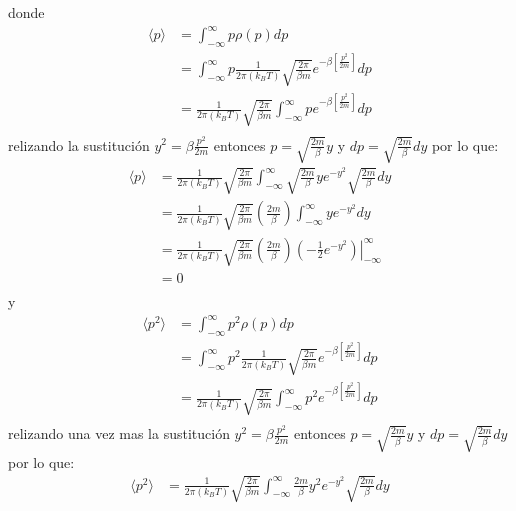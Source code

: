 \documentclass[a4paper]{article}
\begin{document}
\begin{answer}
$$        $$
        donde
        \begin{align*}
            \langle p\rangle &= \int_{-\infty}^{\infty} p \rho(p) dp \\
            &= \int_{-\infty}^{\infty} p \frac{1}{2 \pi (k_B T)} \sqrt{\frac{2\pi}{\beta m}} e^{-\beta\left[\frac{p^2}{2 m}\right]} dp \\
            &= \frac{1}{2 \pi (k_B T)} \sqrt{\frac{2\pi}{\beta m}}  \int_{-\infty}^{\infty} p e^{-\beta\left[\frac{p^2}{2 m}\right]} dp \\
        \end{align*}
        relizando la sustitución $y^2 = \beta \frac{p^2}{2m}$ entonces $p = \sqrt{\frac{2m}{\beta}} y$ y $dp = \sqrt{\frac{2m}{\beta}} dy$ por lo que:
        \begin{align*}
            \langle p\rangle &= \frac{1}{2 \pi (k_B T)} \sqrt{\frac{2\pi}{\beta m}}  \int_{-\infty}^{\infty} \sqrt{\frac{2m}{\beta}} y e^{-y^2} \sqrt{\frac{2m}{\beta}} dy \\
            &= \frac{1}{2 \pi (k_B T)} \sqrt{\frac{2\pi}{\beta m}}\left(
                \frac{2m}{\beta}
            \right)\int_{-\infty}^{\infty} y e^{-y^2} dy \\
            &= \frac{1}{2 \pi (k_B T)} \sqrt{\frac{2\pi}{\beta m}}\left(
                \frac{2m}{\beta}
            \right) \left.\left(-\frac{1}{2} e^{-y^2} \right)\right|_{-\infty}^{\infty} \\
            &= 0 \\
        \end{align*}
        y
        \begin{align*}
            \langle p^2\rangle &= \int_{-\infty}^{\infty} p^2 \rho(p) dp \\
            &= \int_{-\infty}^{\infty} p^2\frac{1}{2 \pi (k_B T)} \sqrt{\frac{2\pi}{\beta m}} e^{-\beta\left[\frac{p^2}{2 m}\right]}  dp \\
            &=\frac{1}{2 \pi (k_B T)} \sqrt{\frac{2\pi}{\beta m}} \int_{-\infty}^{\infty} p^2 e^{-\beta\left[\frac{p^2}{2 m}\right]} dp \\
        \end{align*}
        relizando una vez mas la sustitución $y^2 = \beta \frac{p^2}{2m}$ entonces $p = \sqrt{\frac{2m}{\beta}} y$ y $dp = \sqrt{\frac{2m}{\beta}} dy$ por lo que:
        \begin{align*}
            \langle p^2\rangle &= \frac{1}{2 \pi (k_B T)} \sqrt{\frac{2\pi}{\beta m}}  \int_{-\infty}^{\infty} \frac{2m}{\beta} y^2 e^{-y^2} \sqrt{\frac{2m}{\beta}} dy \\

\end{align*}
\end{answer}
\end{document}
